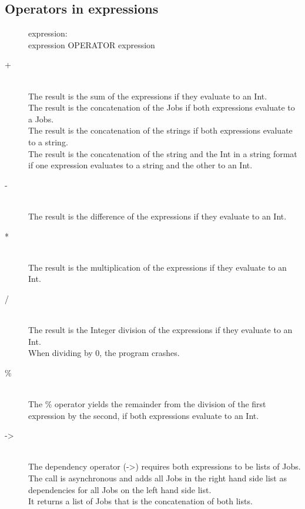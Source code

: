 \documentclass[12pt]{article}
\begin{document}
\subsection{Operators in expressions}
\begin{description}
  \item[]expression: \hfill \\
    expression OPERATOR expression
\end{description}

\begin{description}
\item[+] \hfil \\
The result is the sum of the expressions if they evaluate to an Int.\\
The result is the concatenation of the Jobs if both expressions evaluate to
a Jobs.\\
The result is the concatenation of the strings if both expressions evaluate to
a string.\\
The result is the concatenation of the string and the Int in a string format if
one expression evaluates to a string and the other to an Int.\\

\item[-] \hfil \\
The result is the difference of the expressions if they evaluate to an Int.

\item[*] \hfil \\
The result is the multiplication of the expressions if they evaluate to an Int.

\item[/] \hfil \\
The result is the Integer division of the expressions if they evaluate to an Int.\\
When dividing by 0, the program crashes.

\item[\%] \hfil \\
The \% operator yields the remainder from the division of the first expression by the second, if
both expressions evaluate to an Int.

\item[->] \hfil \\
The dependency operator (->) requires both expressions to be lists of Jobs.\\
The call is asynchronous and adds all Jobs in the right hand side list as dependencies
for all Jobs on the left hand side list.\\
It returns a list of Jobs that is the concatenation of both lists.


\end{description}
\end{document}
